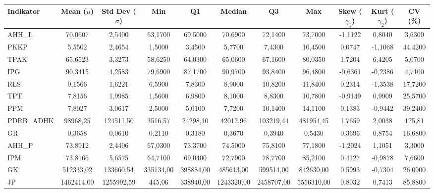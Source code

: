 \begin{adjustbox}{max width=\textwidth}
\small
\begin{tabular}{|>{\centering\arraybackslash}p{2.5cm}|c|c|c|c|c|c|c|c|c|c|}
\hline
\textbf{Indikator} & \textbf{Mean ($\mu$)} & \textbf{Std Dev ($\sigma$)} & \textbf{Min} & \textbf{Q1} & \textbf{Median} & \textbf{Q3} & \textbf{Max} & \textbf{Skew ($\gamma_1$)} & \textbf{Kurt ($\gamma_2$)} & \textbf{CV (\%)} \\
\hline
AHH\_L & 70,0607 & 2,5400 & 63,1700 & 69,5000 & 70,6900 & 72,1400 & 73,7000 & -1,1122 & 0,8040 & 3,6300 \\
PKKP & 5,5502 & 2,4654 & 1,5000 & 3,4500 & 5,7700 & 7,4300 & 10,4500 & 0,0747 & -1,1068 & 44,4200 \\
TPAK & 65,6523 & 3,3273 & 58,6250 & 64,0300 & 65,0600 & 67,1600 & 80,0350 & 1,7204 & 6,4205 & 5,0700 \\
IPG & 90,3415 & 4,2583 & 79,6900 & 87,1700 & 90,9700 & 93,8400 & 96,4800 & -0,6361 & -0,2386 & 4,7100 \\
RLS & 9,1566 & 1,6221 & 6,5900 & 7,8300 & 8,9000 & 10,8200 & 11,8400 & 0,2314 & -1,3538 & 17,7200 \\
TPT & 7,8156 & 1,9985 & 1,5600 & 6,9800 & 8,1000 & 8,8300 & 10,7800 & -0,9149 & 0,9909 & 25,5700 \\
PPM & 7,8027 & 3,0617 & 2,5000 & 5,0100 & 7,7200 & 10,1400 & 14,1100 & 0,1383 & -0,9442 & 39,2400 \\
PDRB\_ADHK & 98968,25 & 124511,50 & 3516,57 & 24298,10 & 42012,96 & 103219,44 & 481954,45 & 1,7659 & 2,0038 & 125,81 \\
GR & 0,3658 & 0,0610 & 0,2110 & 0,3180 & 0,3670 & 0,3940 & 0,5430 & 0,3696 & 0,8754 & 16,6800 \\
AHH\_P & 73,8912 & 2,4406 & 67,0300 & 73,3700 & 74,5000 & 75,8100 & 77,1800 & -1,2024 & 1,1051 & 3,3000 \\
IPM & 73,8166 & 5,6575 & 64,7100 & 69,0400 & 72,7900 & 78,7700 & 85,2100 & 0,4127 & -0,9878 & 7,6600 \\
GK & 512333,02 & 133660,54 & 335134,00 & 398884,00 & 485613,00 & 599514,00 & 842630,00 & 0,5993 & -0,7304 & 26,0900 \\
JP & 1462414,00 & 1255992,59 & 445,06 & 338940,00 & 1243320,00 & 2458707,00 & 5556310,00 & 0,8032 & 0,7413 & 85,8800 \\
\hline
\end{tabular}
\end{adjustbox}
